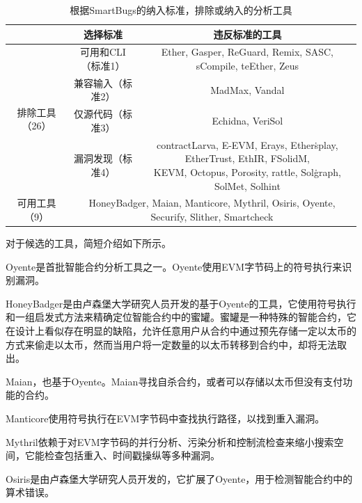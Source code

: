 \begin{table}[htbp]
\begin{footnotesize}
\centering
\begin{tabular}{@{}ccc@{}}
\toprule
 & 选择标准      & 违反标准的工具          \\ \midrule
\multirow{4}{*}{排除工具（26）} & 可用和CLI（标准1） & Ether, Gasper, ReGuard, Remix, SASC, sCompile, teEther, Zeus                                                                      \\
 & 兼容输入（标准2） & MadMax, Vandal   \\
 & 仅源代码（标准3） & Echidna, VeriSol \\
                        & 漏洞发现（标准4）   &\tabincell{c} { contractLarva, E-EVM, Erays, Ether\.splay, EtherTrust, EthIR, FSolidM,\\ KEVM, Octopus, Porosity, rattle, Sol\.graph, SolMet, Solhint} \\ \midrule
可用工具（9）                   & \multicolumn{2}{c}{HoneyBadger, Maian, Manticore, Mythril, Osiris, Oyente, Securify, Slither, Smartcheck}                                       \\ \bottomrule
\end{tabular}
\caption{根据SmartBugs的纳入标准，排除或纳入的分析工具}
\label{tool_select}
\end{footnotesize}
\end{table}

对于候选的工具，简短介绍如下所示。

Oyente\cite{oyente}是首批智能合约分析工具之一。Oyente使用EVM字节码上的符号执行来识别漏洞。

HoneyBadger\cite{honey}是由卢森堡大学研究人员开发的基于Oyente的工具，它使用符号执行和一组启发式方法来精确定位智能合约中的蜜罐。蜜罐是一种特殊的智能合约，它在设计上看似存在明显的缺陷，允许任意用户从合约中通过预先存储一定以太币的方式来偷走以太币，然而当用户将一定数量的以太币转移到合约中，却将无法取出。

Maian\cite{maian}，也基于Oyente。Maian寻找自杀合约，或者可以存储以太币但没有支付功能的合约。

Manticore\cite{manticore}使用符号执行在EVM字节码中查找执行路径，以找到重入漏洞。

Mythril\cite{Mythril}依赖于对EVM字节码的并行分析、污染分析和控制流检查来缩小搜索空间，它能检查包括重入、时间戳操纵等多种漏洞。

Osiris\cite{Osiris}是由卢森堡大学研究人员开发的，它扩展了Oyente，用于检测智能合约中的算术错误。

